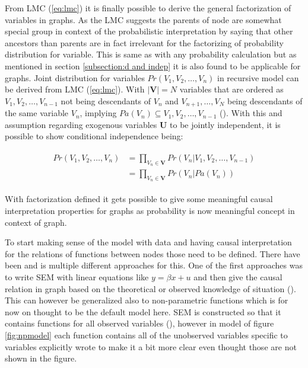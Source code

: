 \documentclass[main=english,12pt,a4paper,pdftex,econ,utf8]{aaltothesis}
\newcommand{\pa}[1]{Pa(#1)}
\newcommand{\vars}{\bm{V}}
\newcommand{\unobs}{\bm{U}}
\begin{document}
From LMC (\ref{eq:lmc}) it is finally possible to derive the general factorization of variables in graphs. As the LMC suggests the parents of node are somewhat special group in context of the probabilistic interpretation by saying that other ancestors than parents are in fact irrelevant for the factorizing of probability distribution for variable. This is same as with any probability calculation but as mentioned in section \ref{subsection:d and indep} it is also found to be applicable for graphs. Joint distribution for variables $Pr(V_1,V_2,\ldots,V_n)$ in recursive model can be derived from LMC (\ref{eq:lmc}). With $|\vars|=N$ variables that are ordered as $V_1,V_2,\ldots,V_{n-1}$ not being descendants of $V_n$ and $V_{n+1},\ldots,V_{N}$ being descendants of the same variable $V_n$, implying $\pa{V_n}\subseteq V_1,V_2,\ldots,V_{n-1}$ (\cite{Heckman2015}). With this and assumption regarding exogenous variables $\unobs$ to be jointly independent, it is possible to show conditional independence being:

\begin{align} \label{eq:factor}
    \begin{split}
        Pr(V_1,V_2,\ldots,V_{n})&=\prod_{V_{n}\in\vars}Pr(V_{n}|V_1,V_2,\ldots,V_{n-1}) \\
        &=\prod_{V_{n}\in\vars}Pr(V_{n}|\pa{V_{n}})
    \end{split}
\end{align}

\noindent With factorization defined it gets possible to give some meaningful causal interpretation properties for graphs as probability is now meaningful concept in context of graph.

To start making sense of the model with data and having causal interpretation for the relations of functions between nodes those need to be defined. There have been and is multiple different approaches for this. One of the first approaches was to write SEM with linear equations like $y=\beta x+u$ and then give the causal relation in graph based on the theoretical or observed knowledge of situation (\cite{Wright1921}). This can however be generalized also to non-parametric functions which is for now on thought to be the default model here. SEM is constructed so that it contains functions for all observed variables (\cite{Pearl2008}), however in model of figure \ref{fig:npmodel} each function contains all of the unobserved variables specific to variables explicitly wrote to make it a bit more clear even thought those are not shown in the figure.
\end{document}
